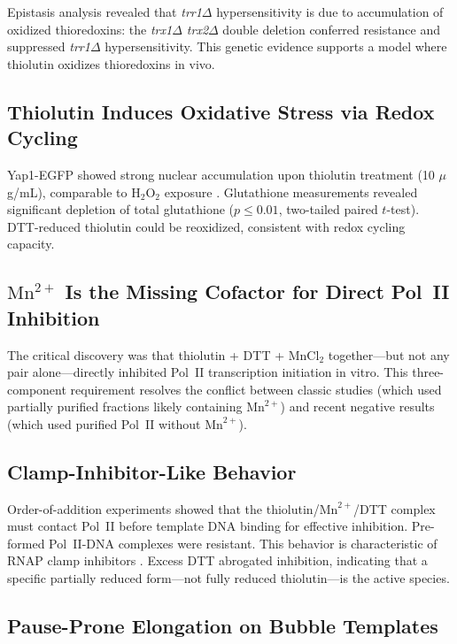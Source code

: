 \documentclass[11pt]{article}
\begin{document}
Epistasis analysis revealed that \textit{trr1$\Delta$} hypersensitivity is due to accumulation of oxidized thioredoxins: the \textit{trx1$\Delta$ trx2$\Delta$} double deletion conferred resistance and suppressed \textit{trr1$\Delta$} hypersensitivity. This genetic evidence supports a model where thiolutin oxidizes thioredoxins in vivo.

\subsection{Thiolutin Induces Oxidative Stress via Redox Cycling}

Yap1-EGFP showed strong nuclear accumulation upon thiolutin treatment (10 $\mu$g/mL), comparable to $\text{H}_2\text{O}_2$ exposure \citep{herrero2008redox}. Glutathione measurements revealed significant depletion of total glutathione ($p \leq 0.01$, two-tailed paired $t$-test). DTT-reduced thiolutin could be reoxidized, consistent with redox cycling capacity.

\subsection{$\text{Mn}^{2+}$ Is the Missing Cofactor for Direct Pol~II Inhibition}

The critical discovery was that thiolutin + DTT + $\text{MnCl}_2$ together---but not any pair alone---directly inhibited Pol~II transcription initiation in vitro. This three-component requirement resolves the conflict between classic studies (which used partially purified fractions likely containing $\text{Mn}^{2+}$) and recent negative results (which used purified Pol~II without $\text{Mn}^{2+}$).

\subsection{Clamp-Inhibitor-Like Behavior}

Order-of-addition experiments showed that the thiolutin/$\text{Mn}^{2+}$/DTT complex must contact Pol~II before template DNA binding for effective inhibition. Pre-formed Pol~II-DNA complexes were resistant. This behavior is characteristic of RNAP clamp inhibitors \citep{belogurov2009structural}. Excess DTT abrogated inhibition, indicating that a specific partially reduced form---not fully reduced thiolutin---is the active species.

\subsection{Pause-Prone Elongation on Bubble Templates}
\end{document}
